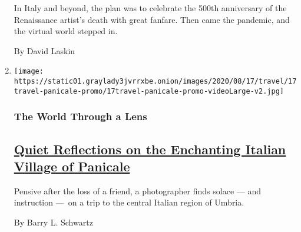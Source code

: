 \begin{enumerate}
  In Italy and beyond, the plan was to celebrate the 500th anniversary
  of the Renaissance artist's death with great fanfare. Then came the
  pandemic, and the virtual world stepped in.

  By David Laskin
\item
  \texttt{[image: https://static01.graylady3jvrrxbe.onion/images/2020/08/17/travel/17travel-panicale-promo/17travel-panicale-promo-videoLarge-v2.jpg]}

  \hypertarget{the-world-through-a-lens}{%
  \subsubsection{The World Through a
  Lens}\label{the-world-through-a-lens}}

  \hypertarget{quiet-reflections-on-the-enchanting-italian-village-of-panicale}{%
  \subsection{\texorpdfstring{\href{/2020/08/17/travel/panicale-italy.html}{Quiet
  Reflections on the Enchanting Italian Village of
  Panicale}}{Quiet Reflections on the Enchanting Italian Village of Panicale}}\label{quiet-reflections-on-the-enchanting-italian-village-of-panicale}}

  Pensive after the loss of a friend, a photographer finds solace ---
  and instruction ---~on a trip to the central Italian region of Umbria.

  By Barry L. Schwartz
\end{enumerate}

